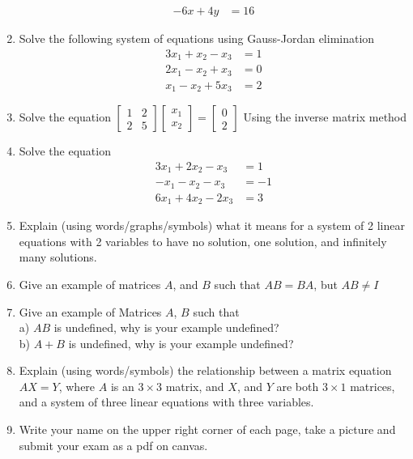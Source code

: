 \documentclass{article}
\begin{document}
\begin{enumerate}
\begin{align*}
            -6x + 4y &= 16
        \end{align*}
        \item Solve the following system of equations using Gauss-Jordan elimination
        \begin{align*}
            3x_1+x_2-x_3 &= 1 \\
            2x_1-x_2+x_3 &= 0 \\
            x_1-x_2+5x_3 &= 2
        \end{align*}
        \item Solve the equation $\begin{bmatrix} 1 & 2 \\ 2 & 5 \end{bmatrix} \begin{bmatrix} x_1 \\ x_2 \end{bmatrix}=\begin{bmatrix} 0 \\ 2 \end{bmatrix}$  Using the inverse matrix method
        \item Solve the equation 
        \begin{align}
            3x_1+2x_2-x_3 &= 1 \\
            -x_1-x_2-x_3 &= -1 \\
            6x_1+4x_2-2x_3 &=3
        \end{align}
        \item Explain (using words/graphs/symbols) what it means for a system of 2 linear equations with 2 variables to have no solution, one solution, and infinitely many solutions.
        \item Give an example of matrices $A$, and $B$ such that $AB=BA$, but $AB \neq I$
        \item Give an example of Matrices $A$, $B$ such that \\
            a) $AB$ is undefined, why is your example undefined? \\
            b) $A+B$ is undefined, why is your example undefined?
        \item Explain (using words/symbols) the relationship between a matrix equation $AX=Y$, where $A$ is an $3 \times 3$ matrix, and $X$, and $Y$ are both $3 \times 1$ matrices, and a system of three linear equations with three variables.
        \item Write your name on the upper right corner of each page, take a picture and submit your exam as a pdf on canvas.

            
        \end{enumerate}
\end{document}
